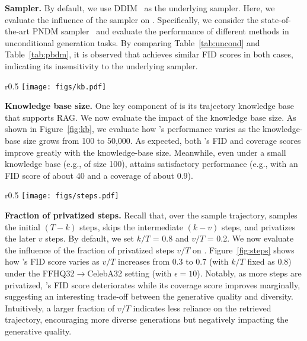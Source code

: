 {\bf Sampler.} By default, we use DDIM~\citep{song2020denoising} as the underlying sampler. Here, we evaluate the influence of the sampler on \system. Specifically, we consider the state-of-the-art PNDM sampler~\citep{liu2022pseudo} and evaluate the performance of different methods in unconditional generation tasks. By comparing Table~\ref{tab:uncond} and Table~\ref{tab:pbdm}, it is observed that \system achieves similar FID scores in both cases, indicating its insensitivity to the underlying sampler.


\begin{wrapfigure}{r}{0.5\textwidth}
    \centering
   \vspace{5pt}
\texttt{[image: figs/kb.pdf]}
    \caption{Impact of knowledge-base size.}
    \label{fig:kb}
\end{wrapfigure}
\textbf{Knowledge base size.} One key component of \system is its trajectory knowledge base that supports RAG. We now evaluate the impact of the knowledge base size. As shown in Figure~\ref{fig:kb}, we evaluate how \system's performance varies as the knowledge-base size grows from 100 to 50,000. As expected, both \system's FID and coverage scores improve greatly with the knowledge-base size. Meanwhile, even under a small knowledge base (e.g., of size 100), \system attains satisfactory performance (e.g., with an FID score of about 40 and a coverage of about 0.9). 



\begin{wrapfigure}{r}{0.5\textwidth}
    \centering
   \vspace{-25pt}
\texttt{[image: figs/steps.pdf]}
    \caption{Impact of the fraction of privatized steps.}
    \label{fig:steps}
\end{wrapfigure}
\textbf{Fraction of privatized steps.} Recall that, over the sample trajectory, \system samples the initial $(T - k)$ steps, skips the intermediate $(k - v)$ steps, and privatizes the later $v$ steps. By default, we set $k/T$ = 0.8 and $v/T$ = 0.2. We now evaluate the influence of the fraction of privatized steps $v/T$ on \system.
Figure~\ref{fig:steps} shows how \system's FID score varies as $v/T$ increases from 0.3 to 0.7 (with $k/T$ fixed as 0.8) under the FFHQ32$\rightarrow$CelebA32 setting (with $\epsilon = 10$). Notably, as more steps are privatized, \system's FID score deteriorates while its coverage score improves marginally, suggesting an interesting trade-off between the generative quality and diversity. Intuitively, a larger fraction of $v/T$ indicates less reliance on the retrieved trajectory, encouraging more diverse generations but negatively impacting the generative quality.

